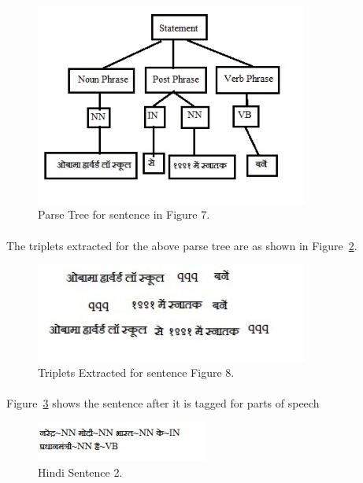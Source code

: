 \begin{figure}[htb]
\centering
\includegraphics[width=0.8\textwidth]{images/standalone_testcase.jpg}
\caption{Parse Tree for sentence in Figure 7.} 
\label{fig:standalone_testcase}
\end{figure}

\paragraph{}
The triplets extracted for the above parse tree are as shown in Figure~\ref{fig:triplet_standalone}.

\begin{figure}[htb]
\centering
\includegraphics[width=0.8\textwidth]{images/triplet_standalone.jpg}
\caption{Triplets Extracted for sentence Figure 8.} 
\label{fig:triplet_standalone}
\end{figure}

\break
\paragraph{}
Figure~\ref{fig:sentence_testcase2} shows the sentence after it is tagged for parts of speech

\begin{figure}[htb]
\centering
\includegraphics[width=0.5\textwidth]{images/sentence_testcase2.jpg}
\caption{Hindi Sentence 2.} 
\label{fig:sentence_testcase2}
\end{figure}

